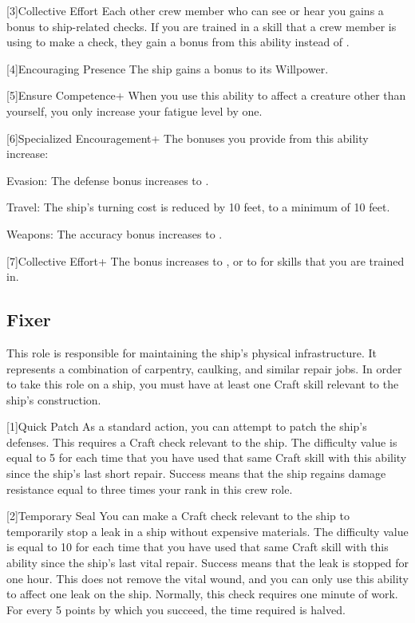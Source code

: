         [3]{Collective Effort} Each other crew member who can see or hear you gains a  bonus to ship-related checks.
        If you are trained in a skill that a crew member is using to make a check, they gain a  bonus from this ability instead of .

        [4]{Encouraging Presence} The ship gains a  bonus to its Willpower.

        [5]{Ensure Competence+} When you use this ability to affect a creature other than yourself, you only increase your fatigue level by one.

        [6]{Specialized Encouragement+} The bonuses you provide from this ability increase:
        \begin{raggeditemize}
            \item Evasion: The defense bonus increases to .
            \item Travel: The ship's turning cost is reduced by 10 feet, to a minimum of 10 feet.
            \item Weapons: The accuracy bonus increases to .
        \end{raggeditemize}

        [7]{Collective Effort+} The bonus increases to , or to  for skills that you are trained in.

    \subsection{Fixer}
        This role is responsible for maintaining the ship's physical infrastructure.
        It represents a combination of carpentry, caulking, and similar repair jobs.
        In order to take this role on a ship, you must have at least one Craft skill relevant to the ship's construction.

        [1]{Quick Patch} As a standard action, you can attempt to patch the ship's defenses.
        This requires a Craft check relevant to the ship.
        The difficulty value is equal to 5  for each time that you have used that same Craft skill with this ability since the ship's last short repair.
        Success means that the ship regains damage resistance equal to three times your rank in this crew role.

        [2]{Temporary Seal} You can make a Craft check relevant to the ship to temporarily stop a leak in a ship without expensive materials.
        The difficulty value is equal to 10  for each time that you have used that same Craft skill with this ability since the ship's last vital repair.
        Success means that the leak is stopped for one hour.
        This does not remove the vital wound, and you can only use this ability to affect one leak on the ship.
        Normally, this check requires one minute of work.
        For every 5 points by which you succeed, the time required is halved.

